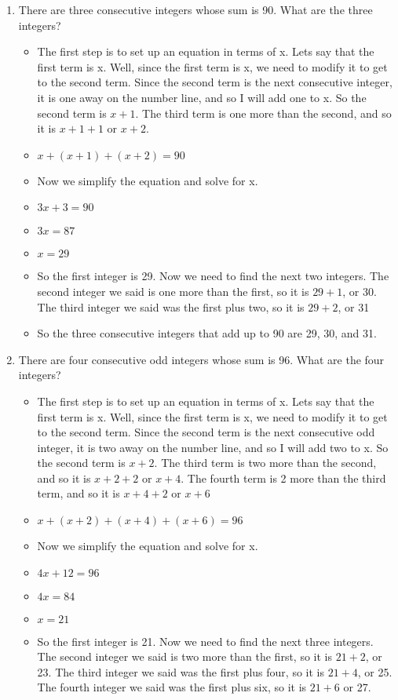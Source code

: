 \documentclass{article}
\begin{document}
\begin{enumerate}
\item There are three consecutive integers whose sum is 90. What are the three integers?
  \begin{itemize}
  \item The first step is to set up an equation in terms of x. Lets say that the first term is x. Well, since the first term is x, we need to modify it to get to the second term. Since the second term is the next consecutive integer, it is one away on the number line, and so I will add one to x. So the second term is $x+1$. The third term is one more than the second, and so it is $x+1+1$ or $x+2$.
  \item [] $x+(x+1)+(x+2)=90$
  \item Now we simplify the equation and solve for x.
  \item [] $3x+3=90$
  \item [] $3x=87$
  \item [] $x=29$
  \item So the first integer is 29. Now we need to find the next two integers. The second integer we said is one more than the first, so it is $29+1$, or 30. The third integer we said was the first plus two, so it is $29+2$, or 31
  \item So the three consecutive integers that add up to 90 are 29, 30, and 31.
  \end{itemize}
\item There are four consecutive odd integers whose sum is 96. What are the four integers?
  \begin{itemize}
  \item The first step is to set up an equation in terms of x. Lets say that the first term is x. Well, since the first term is x, we need to modify it to get to the second term. Since the second term is the next consecutive odd integer, it is two away on the number line, and so I will add two to x. So the second term is $x+2$. The third term is two more than the second, and so it is $x+2+2$ or $x+4$. The fourth term is 2 more than the third term, and so it is $x+4+2$ or $x+6$
  \item [] $x+(x+2)+(x+4)+(x+6)=96$
  \item Now we simplify the equation and solve for x.
  \item [] $4x+12=96$
  \item [] $4x=84$
  \item [] $x=21$
  \item So the first integer is 21. Now we need to find the next three integers. The second integer we said is two more than the first, so it is $21+2$, or 23. The third integer we said was the first plus four, so it is $21+4$, or 25. The fourth integer we said was the first plus six, so it is $21+6$ or 27.

\end{itemize}
\end{enumerate}
\end{document}
